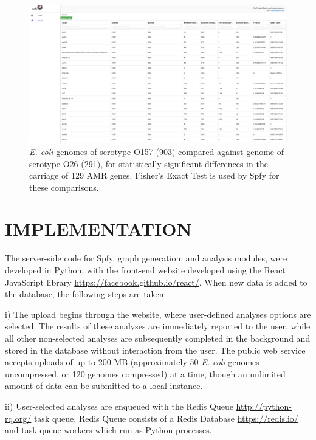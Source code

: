 \documentclass{article}
\begin{document}
\begin{figure}[!hb]
\begin{center}
\includegraphics[width=\textwidth]{images/o157vo26_amrgenes}
\end{center}
\caption{
\textit{E. coli} genomes of serotype O157 (903) compared against genome of serotype O26 (291), for statistically significant differences in the carriage of 129 AMR genes. Fisher's Exact Test is used by Spfy for these comparisons.}
\label{fig-groupings}
\end{figure}

\section{IMPLEMENTATION}
The server-side code for Spfy, graph generation, and analysis modules, were developed in Python, with the front-end website developed using the React JavaScript library \url{https://facebook.github.io/react/}. When new data is added to the database, the following steps are taken:

i) The upload begins through the website, where user-defined analyses options are selected. The results of these analyses are immediately reported to the user, while all other non-selected analyses are subsequently completed in the background and stored in the database without interaction from the user. The public web service accepts uploads of up to 200 MB (approximately 50 \textit {E. coli} genomes uncompressed, or 120 genomes compressed) at a time, though an unlimited amount of data can be submitted to a local instance.

ii) User-selected analyses are enqueued with the Redis Queue \url{http://python-rq.org/} task queue. Redis Queue consists of a Redis Database \url{https://redis.io/} and task queue workers which run as Python processes.
\end{document}
